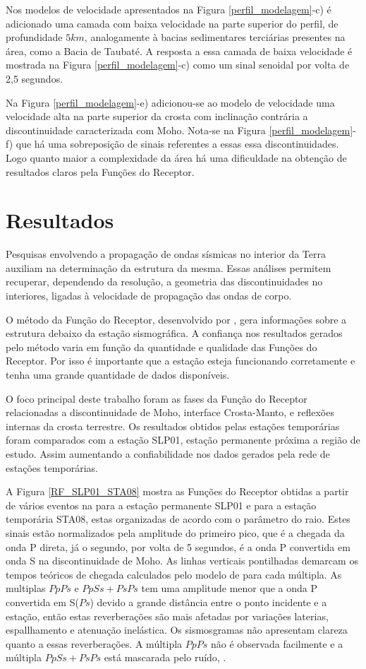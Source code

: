Nos modelos de velocidade apresentados na Figura \ref{perfil_modelagem}-c) é adicionado uma camada com baixa velocidade na parte superior do perfil, de profundidade $5 km$, analogamente à bacias sedimentares terciárias presentes na área, como a Bacia de Taubaté. A resposta a essa camada de baixa velocidade é mostrada na Figura \ref{perfil_modelagem}-c) como um sinal senoidal por volta de 2,5 segundos.

Na Figura \ref{perfil_modelagem}-e) adicionou-se ao modelo de velocidade uma velocidade alta na parte superior da crosta com inclinação contrária a discontinuidade caracterizada com Moho. Nota-se na Figura \ref{perfil_modelagem}-f) que há uma sobreposição de sinais referentes a essas essa discontinuidades. Logo quanto maior a complexidade da área há uma dificuldade na obtenção de resultados claros pela Funções do Receptor.

\section{Resultados}

Pesquisas envolvendo a propagação de ondas sísmicas no interior da Terra auxiliam na determinação da estrutura da mesma. Essas análises permitem recuperar, dependendo da resolução, a geometria das discontinuidades no interiores, ligadas à velocidade de propagação das ondas de corpo.  

O método da Função do Receptor, desenvolvido por \cite{Langston_1977}, gera informações sobre a estrutura debaixo da estação sismográfica. A confiança nos resultados gerados pelo método varia em função da quantidade e qualidade das Funções do Receptor. Por isso é importante que a estação esteja funcionando corretamente e tenha uma grande quantidade de dados disponíveis.

O foco principal deste trabalho foram as fases da Função do Receptor relacionadas a discontinuidade de Moho, interface Crosta-Manto, e reflexões internas da crosta terrestre. Os resultados obtidos pelas estações temporárias foram comparados com a estação SLP01, estação permanente próxima a região de estudo. Assim aumentando a confiabilidade nos dados gerados pela rede de estações temporárias.

A Figura \ref{RF_SLP01_STA08} mostra as Funções do Receptor obtidas a partir de vários eventos na para a estação permanente SLP01 e para a estação temporária STA08, estas organizadas de acordo com o parâmetro do raio. Estes sinais estão normalizados pela amplitude do primeiro pico, que é a chegada da onda P direta, já o segundo, por volta de 5 segundos, é a onda P convertida em onda S na discontinuidade de Moho. As linhas verticais pontilhadas demarcam os tempos teóricos de chegada calculados pelo modelo de \cite{kennet_iaspei_1991} para cada múltipla. As multiplas $PpPs$ e $PpSs+PsPs$ tem uma amplitude menor que a onda P convertida em S($Ps$) devido a grande distância entre o ponto incidente e a estação, então estas reverberações são mais afetadas por variações laterias, espallhamento e atenuação inelástica. Os sismosgramas não apresentam clareza quanto a essas reverberações. A múltipla $PpPs$ não é observada facilmente e a múltipla $PpSs+PsPs$ está mascarada pelo ruído, .

